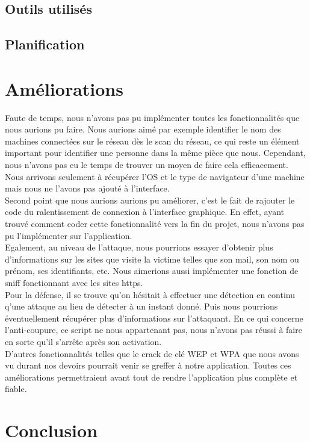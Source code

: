\documentclass[11pt]{article}
\begin{document}
\subsection{Outils utilisés}
\subsection{Planification}

\section{Améliorations}
Faute de temps, nous n'avons pas pu implémenter toutes les fonctionnalités que nous aurions pu faire. Nous aurions aimé par exemple identifier le nom des machines connectées sur le réseau dès le scan du réseau, ce qui reste un élément important pour identifier une personne dans la même pièce que nous. Cependant, nous n'avons pas eu le temps de trouver un moyen de faire cela efficacement. Nous arrivons seulement à récupérer l'OS et le type de navigateur d'une machine mais nous ne l'avons pas ajouté à l'interface.~\\
Second point que nous aurions aurions pu améliorer, c'est le fait de rajouter le code du ralentissement de connexion à l'interface graphique. En effet, ayant trouvé comment coder cette fonctionnalité vers la fin du projet, nous n'avons pas pu l'implémenter sur l'application.~\\
Egalement, au niveau de l'attaque, nous pourrions essayer d'obtenir plus d'informations sur les sites que visite la victime telles que son mail, son nom ou prénom, ses identifiants, etc. Nous aimerions aussi implémenter une fonction de sniff fonctionnant avec les sites https.~\\
Pour la défense, il se trouve qu'on hésitait à effectuer une détection en continu q'une attaque au lieu de détecter à un instant donné. Puis nous pourrions éventuellement récupérer plus d'informations sur l'attaquant. En ce qui concerne l'anti-coupure, ce script ne nous appartenant pas, nous n'avons pas réussi à faire en sorte qu'il s'arrête après son activation.~\\
D'autres fonctionnalités telles que le crack de clé WEP et WPA que nous avons vu durant nos devoirs pourrait venir se greffer à notre application. Toutes ces améliorations permettraient avant tout de rendre l'application plus complète et fiable.

\section*{Conclusion}

\newpage
\listoffigures
\lstlistoflistings
\end{document}
